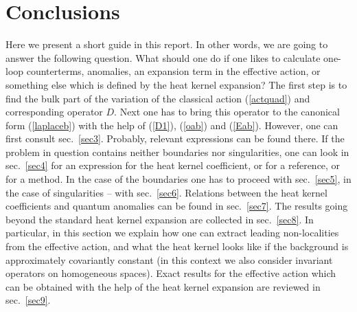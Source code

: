 \section{Conclusions}\label{sec10}
Here we present a short guide in this report. In other words, we
are going to answer the following question. What should one do if
one likes to calculate one-loop counterterms, anomalies, an
expansion term in the effective action, or something else which is
defined by the heat kernel expansion? The first step is to find
the bulk part of the variation of the classical action
(\ref{actquad}) and corresponding operator $D$. Next one has to
bring this operator to the canonical form (\ref{laplaceb}) with
the help of (\ref{D1}), (\ref{oab}) and (\ref{Eab}). However, one
can first consult sec.\ \ref{sec3}. Probably, relevant expressions
can be found there. If the problem in question contains neither
boundaries nor singularities, one can look in sec.\ \ref{sec4} for
an expression for the heat kernel coefficient, or for a reference,
or for a method. In the case of the boundaries one has to proceed
with sec.\ \ref{sec5}, in the case of singularities -- with sec.\
\ref{sec6}. Relations between the heat kernel coefficients and
quantum anomalies can be found in sec.\ \ref{sec7}. The results
going beyond the standard heat kernel expansion are collected in
sec.\ \ref{sec8}. In particular, in this section we explain how
one can extract leading non-localities from the effective action,
and what the heat kernel looks like if the background is
approximately covariantly constant (in this context we also consider
invariant operators on homogeneous spaces). Exact results for the
effective action which can be obtained with the help of the heat
kernel expansion are reviewed in sec.\ \ref{sec9}.

